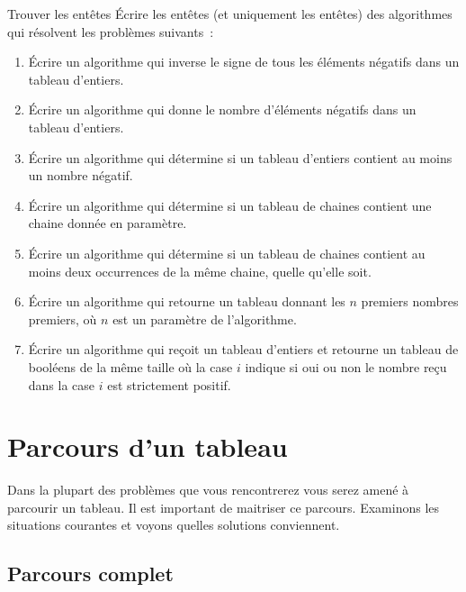 			\begin{Exercice}{Trouver les entêtes}
				Écrire les entêtes (et uniquement les entêtes)
				des algorithmes qui résolvent les problèmes suivants~:
				\begin{enumerate}[label=\alph*)]
				\item
					Écrire un algorithme qui 
					inverse le signe de tous les éléments négatifs dans un tableau d’entiers.
				\item
					Écrire un algorithme qui
					donne le nombre d’éléments négatifs dans un tableau d’entiers.
				\item
					Écrire un algorithme qui
					détermine si un tableau d’entiers contient au moins un nombre négatif.
				\item
					Écrire un algorithme qui
					détermine si un tableau de chaines contient
					une chaine donnée en paramètre.
				\item
					Écrire un algorithme qui
					détermine si un tableau de chaines contient
					au moins deux occurrences de la même chaine,
					quelle qu’elle soit.
				\item
					Écrire un algorithme qui 
					retourne un tableau donnant les $n$ premiers nombres premiers,
					où $n$ est un paramètre de l’algorithme.
				\item
					Écrire un algorithme qui 
					reçoit un tableau d’entiers
					et retourne un tableau de booléens de la même taille
					où la case $i$ indique si oui ou non
					le nombre reçu dans la case $i$ est strictement positif.
				\end{enumerate}
			\end{Exercice}
		
	\section{Parcours d’un tableau} 
	\label{Les parcours de tableaux}

		Dans la plupart des problèmes que vous rencontrerez
		vous serez amené à parcourir un tableau.
		Il est important de maitriser ce parcours.
		Examinons les situations courantes 
		et voyons quelles solutions conviennent.
	
		\subsection{Parcours complet}
		
